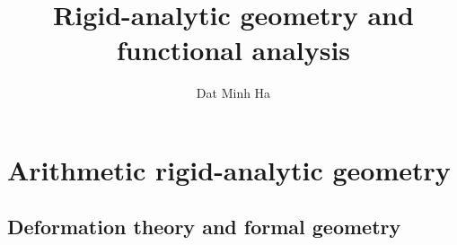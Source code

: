 

\setcounter{chapter}{-1}




    \title{Rigid-analytic geometry and functional analysis}
    
    \author{Dat Minh Ha}
    \maketitle
    
    \begin{abstract}
        
    \end{abstract}
    
    {
      \hypersetup{} 
      \dominitoc
      \tableofcontents %
    }
    
    

    \part{Arithmetic rigid-analytic geometry}
        \chapter{Deformation theory and formal geometry}
            \begin{abstract}
                
            \end{abstract}
            
            \minitoc
        
            
            
            
            
            
            
            
            
            
            
            
            
            
            
